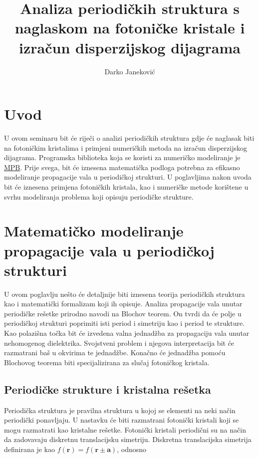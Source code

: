 \documentclass[utf8, seminar]{fer}
\begin{document}
\title{Analiza periodičkih struktura s naglaskom na fotoničke kristale
	   i izračun disperzijskog dijagrama}
\author{Darko Janeković}

\maketitle

\tableofcontents


\chapter{Uvod}
U ovom seminaru bit će riječi o analizi periodičkih struktura gdje će naglasak
biti na fotoničkim kristalima i primjeni numeričkih metoda na izračun
disperzijskog dijagrama. Programska biblioteka koja se koristi za numeričko
modeliranje je \href{https://github.com/stevengj/mpb}{MPB}. Prije svega, bit će
iznesena matematička podloga potrebna za efikasno modeliranje propagacije vala u
periodičkoj strukturi. U poglavljima nakon uvoda bit će iznesena primjena
fotoničkih kristala, kao i numeričke metode korištene u svrhu modeliranja
problema koji opisuju periodičke strukture.


\chapter{Matematičko modeliranje propagacije vala u periodičkoj strukturi}

U ovom poglavlju nešto će detaljnije biti iznesena teorija periodičkih struktura
kao i matematički formalizam koji ih opisuje. Analiza propagacije vala unutar
periodičke rešetke prirodno navodi na Blochov teorem. On tvrdi da će polje u
periodičkoj strukturi poprimiti isti period i simetriju kao i period te strukture.
Kao polazišna točka bit će izvedena valna jednadžba za propagaciju vala unutar
nehomogenog dielektrika. Svojstveni problem i njegova interpretacija bit će
razmatrani baš u okvirima te jednadžbe. Konačno će jednadžba pomoću Blochovog
teorema biti specijalizirana za slučaj fotoničkog kristala.


\section{Periodičke strukture i kristalna rešetka}

Periodička struktura je pravilna struktura u kojoj se elementi na neki način
periodički ponavljaju. U nastavku će biti razmatrani fotonički kristali koji se
mogu razmatrati kao kristalne rešetke. Fotonički kristali periodični su na način
da zadovavaju diskretnu translacijsku simetriju.
Diskretna translacijska simetrija definirana je kao
${f(\mathbf{r}) = f(\mathbf{r} \pm \mathbf{a})}$, odnosno
\end{document}
